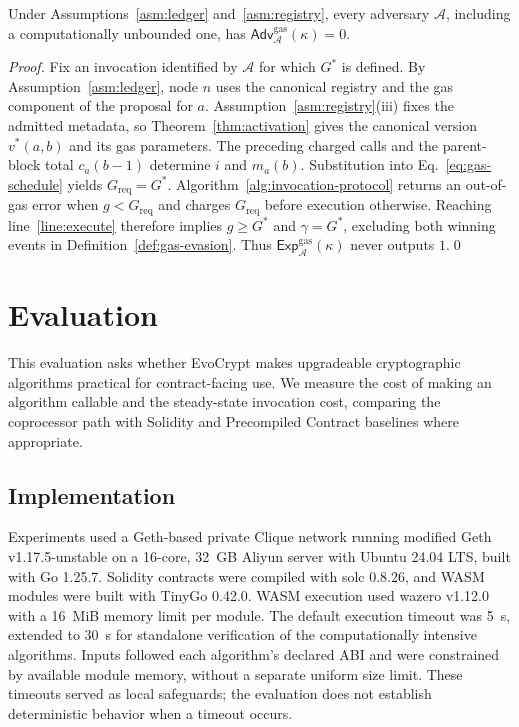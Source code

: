 \documentclass[runningheads]{llncs}
\begin{document}
\begin{theorem}
\label{thm:gas-soundness}
Under Assumptions~\ref{asm:ledger} and~\ref{asm:registry}, every adversary $\mathcal{A}$, including a computationally unbounded one, has $\mathsf{Adv}^{\mathrm{gas}}_{\mathcal{A}}(\kappa)=0$.
\end{theorem}

\begin{proof}
Fix an invocation identified by $\mathcal{A}$ for which $G^{*}$ is defined. By Assumption~\ref{asm:ledger}, node $n$ uses the canonical registry and the gas component of the proposal for $a$. Assumption~\ref{asm:registry}(iii) fixes the admitted metadata, so Theorem~\ref{thm:activation} gives the canonical version $v^{*}(a,b)$ and its gas parameters. The preceding charged calls and the parent-block total $c_a(b-1)$ determine $i$ and $m_a(b)$. Substitution into Eq.~\eqref{eq:gas-schedule} yields $G_{\mathrm{req}}=G^{*}$. Algorithm~\ref{alg:invocation-protocol} returns an out-of-gas error when $g<G_{\mathrm{req}}$ and charges $G_{\mathrm{req}}$ before execution otherwise. Reaching line~\ref{line:execute} therefore implies $g\geq G^{*}$ and $\gamma=G^{*}$, excluding both winning events in Definition~\ref{def:gas-evasion}. Thus $\mathsf{Exp}^{\mathrm{gas}}_{\mathcal{A}}(\kappa)$ never outputs $1$.\qed
\end{proof}

\section{Evaluation}\label{sec5}

This evaluation asks whether EvoCrypt makes upgradeable cryptographic algorithms practical for contract-facing use. We measure the cost of making an algorithm callable and the steady-state invocation cost, comparing the coprocessor path with Solidity and Precompiled Contract baselines where appropriate.

\subsection{Implementation}\label{sec5.1}

Experiments used a Geth-based private Clique network running modified Geth v1.17.5-unstable on a 16-core, 32~GB Aliyun server with Ubuntu 24.04 LTS, built with Go 1.25.7. Solidity contracts were compiled with solc 0.8.26, and WASM modules were built with TinyGo 0.42.0. WASM execution used wazero v1.12.0 with a 16~MiB memory limit per module. The default execution timeout was 5~s, extended to 30~s for standalone verification of the computationally intensive algorithms. Inputs followed each algorithm's declared ABI and were constrained by available module memory, without a separate uniform size limit. These timeouts served as local safeguards; the evaluation does not establish deterministic behavior when a timeout occurs.
\end{document}
